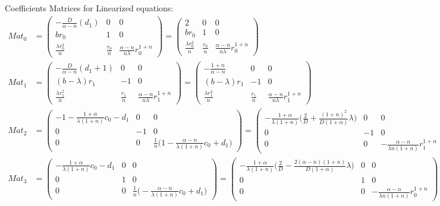 \documentclass[a4paper,11pt]{article}
\begin{document}
Coefficients Matrices for Linearized equations:
\begin{align*}
 Mat_0 &= \begin{pmatrix}
          -\frac{D}{\alpha-n}(d_1) & 0 & 0\\
          br_0 & 1 & 0\\
          \frac{\lambda r_0^2}{n} & \frac{r_0}{n} & \frac{\alpha-n}{n\lambda}r_0^{1+n}
         \end{pmatrix}
        = \begin{pmatrix}
          2 & 0 & 0\\
          br_0 & 1 & 0\\
          \frac{\lambda r_0^2}{n} & \frac{r_0}{n} & \frac{\alpha-n}{n\lambda}r_0^{1+n}
         \end{pmatrix}\\
 Mat_1 &= \begin{pmatrix}
          -\frac{D}{\alpha-n}(d_1+1) & 0 & 0\\
          (b-\lambda)r_1 & -1 & 0\\
          \frac{\lambda r_1^2}{n} & \frac{r_1}{n} & \frac{\alpha-n}{n\lambda}r_1^{1+n}
         \end{pmatrix}
        =\begin{pmatrix}
          -\frac{1+n}{\alpha-n} & 0 & 0\\
          (b-\lambda)r_1 & -1 & 0\\
          \frac{\lambda r_1^2}{n} & \frac{r_1}{n} & \frac{\alpha-n}{n\lambda}r_1^{1+n}
         \end{pmatrix}\\
 Mat_2 &= \begin{pmatrix}
	  -1-\frac{1+\alpha}{\lambda(1+n)} c_0 -d_1 & 0 & 0\\
	  0 & -1 & 0\\
	  0 & 0 & \frac{1}{n}\Big(1-\frac{\alpha-n}{\lambda(1+n)} c_0 +d_1\Big)
         \end{pmatrix}
        = \begin{pmatrix}
	  -\frac{1+\alpha}{\lambda(1+n)} \Big(\frac{2}{D} + \frac{(1+n)^2}{D(1+\alpha)}\lambda\Big) & 0 & 0\\
	  0 & -1 & 0\\
	  0 & 0 & -\frac{\alpha-n}{\lambda n(1+n)}r_1^{1+n}
         \end{pmatrix}\\
 Mat_3 &= \begin{pmatrix}
	  -\frac{1+\alpha}{\lambda(1+n)} c_0 -d_1 & 0 & 0\\
	  0 & 1 & 0\\
	  0 & 0 & \frac{1}{n}\Big(-\frac{\alpha-n}{\lambda(1+n)} c_0 +d_1\Big)
         \end{pmatrix}
	=\begin{pmatrix}
	  -\frac{1+\alpha}{\lambda(1+n)} \Big(\frac{2}{D} - \frac{2(\alpha-n)(1+n)}{D(1+\alpha)}\lambda\Big)& 0 & 0\\
	  0 & 1 & 0\\
	  0 & 0 & -\frac{\alpha-n}{\lambda n(1+n)}r_0^{1+n}
         \end{pmatrix}
\end{align*}
\end{document}
